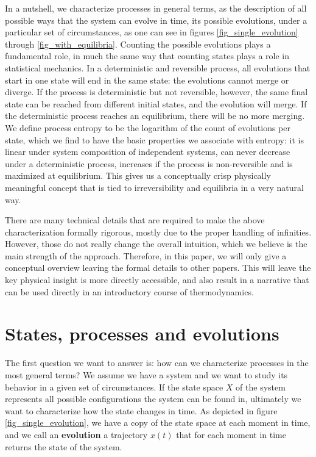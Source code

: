 \documentclass[letterpaper,twocolumn]{article}
\begin{document}
In a nutshell, we characterize processes in general terms, as the description of all possible ways that the system can evolve in time, its possible evolutions, under a particular set of circumstances, as one can see in figures \ref{fig_single_evolution} through \ref{fig_with_equilibria}. Counting the possible evolutions plays a fundamental role, in much the same way that counting states plays a role in statistical mechanics. In a deterministic and reversible process, all evolutions that start in one state will end in the same state: the evolutions cannot merge or diverge. If the process is deterministic but not reversible, however, the same final state can be reached from different initial states, and the evolution will merge. If the deterministic process reaches an equilibrium, there will be no more merging. We define process entropy to be the logarithm of the count of evolutions per state, which we find to have the basic properties we associate with entropy: it is linear under system composition of independent systems, can never decrease under a deterministic process, increases if the process is non-reversible and is maximized at equilibrium. This gives us a conceptually crisp physically meaningful concept that is tied to irreversibility and equilibria in a very natural way.

There are many technical details that are required to make the above characterization formally rigorous, mostly due to the proper handling of infinities. However, those do not really change the overall intuition, which we believe is the main strength of the approach. Therefore, in this paper, we will only give a conceptual overview leaving the formal details to other papers. This will leave the key physical insight is more directly accessible, and also result in a narrative that can be used directly in an introductory course of thermodynamics.

\section{States, processes and evolutions}

The first question we want to answer is: how can we characterize processes in the most general terms? We assume we have a system and we want to study its behavior in a given set of circumstances. If the state space $X$ of the system represents all possible configurations the system can be found in, ultimately we want to characterize how the state changes in time. As depicted in figure \ref{fig_single_evolution}, we have a copy of the state space at each moment in time, and we call an \textbf{evolution} a trajectory $x(t)$ that for each moment in time returns the state of the system. 
\end{document}
